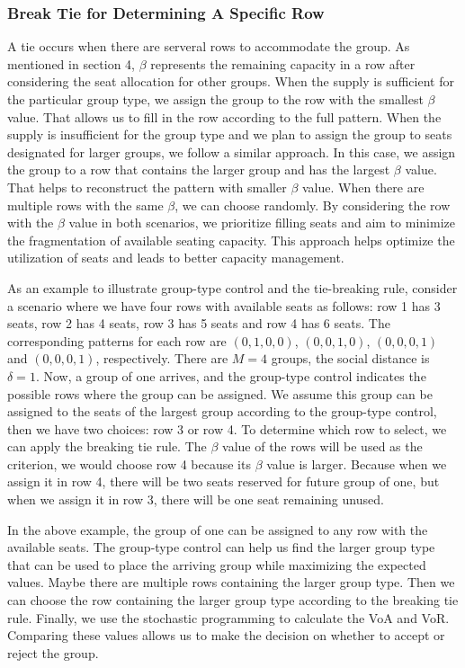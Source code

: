 \subsubsection*{Break Tie for Determining A Specific Row}
A tie occurs when there are serveral rows to accommodate the group. As mentioned in section 4, $\beta$ represents the remaining capacity in a row after considering the seat allocation for other groups.
When the supply is sufficient for the particular group type, we assign the group to the row with the smallest $\beta$ value. That allows us to fill in the row according to the full pattern. When the supply is insufficient for the group type and we plan to assign the group to seats designated for larger groups, we follow a similar approach. In this case, we assign the group to a row that contains the larger group and has the largest $\beta$ value. That helps to reconstruct the pattern with smaller $\beta$ value. When there are multiple rows with the same $\beta$, we can choose randomly. By considering the row with the $\beta$ value in both scenarios, we prioritize filling seats and aim to minimize the fragmentation of available seating capacity. This approach helps optimize the utilization of seats and leads to better capacity management.

As an example to illustrate group-type control and the tie-breaking rule, consider a scenario where we have four rows with available seats as follows: row 1 has 3 seats, row 2 has 4 seats, row 3 has 5 seats and row 4 has 6 seats. The corresponding patterns for each row are $(0,1,0,0)$, $(0,0,1,0)$, $(0,0,0,1)$ and $(0,0,0,1)$, respectively. There are $M =4$ groups, the social distance is $\delta =1$. Now, a group of one arrives,  and the group-type control indicates the possible rows where the group can be assigned. We assume this group can be assigned to the seats of the largest group according to the group-type control, then we have two choices: row 3 or row 4. To determine which row to select, we can apply the breaking tie rule. The $\beta$ value of the rows will be used as the criterion, we would choose row 4 because its $\beta$ value is larger. Because when we assign it in row 4, there will be two seats reserved for future group of one, but when we assign it in row 3, there will be one seat remaining unused.

In the above example, the group of one can be assigned to any row with the available seats. The group-type control can help us find the larger group type that can be used to place the arriving group while maximizing the expected values. Maybe there are multiple rows containing the larger group type. Then we can choose the row containing the larger group type according to the breaking tie rule. 
Finally, we use the stochastic programming to calculate the VoA and VoR. Comparing these values allows us to make the decision on whether to accept or reject the group.


